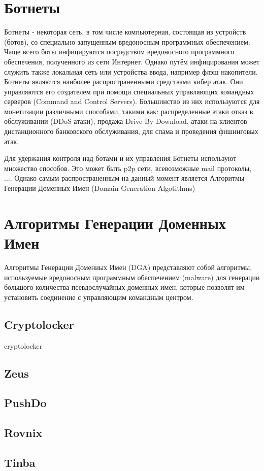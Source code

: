 \section{Ботнеты}
Ботнеты - некоторая сеть, в том числе компьютерная, состоящая из устройств (ботов), со специально запущенным вредоносным программных обеспечением. Чаще всего боты инфицируются посредством вредоносного программного обеспечения, полученного из сети Интернет. Однако путём инфицирования может служить также локальная сеть или устройства ввода, например флэш накопители. Ботнеты являются наиболее распространенными средствами кибер атак. Они управляются его создателем при помощи специальных управляющих командных серверов (Command and Control Servers). Большинство из них используются для монетизации различными способами, такими как: распределенные атаки отказ в обслуживании (DDoS атаки), продажа Drive By Download, атаки на клиентов дистанционного банковского обслуживания, для спама и проведения фишинговых атак.

Для удержания контроля над ботами и их управления Ботнеты используют множество способов. Это может быть p2p сети, всевозможные mail протоколы, ....
Однако самым распространенным на данный момент является Алгоритмы Генерации Доменных Имен (Domain Generation Algotithms)
\clearpage

\section{Алгоритмы Генерации Доменных Имен}
Алгоритмы Генерации Доменных Имен (DGA) представляют собой алгоритмы, используемые вредоносным программным обеспечением (malware) для генерации большого количества псевдослучайных доменных имен, которые позволят им установить соединение с управляющим командным центром.
\subsection{Cryptolocker}
cryptolocker
\subsection{Zeus}
\subsection{PushDo}
\subsection{Rovnix}
\subsection{Tinba}
